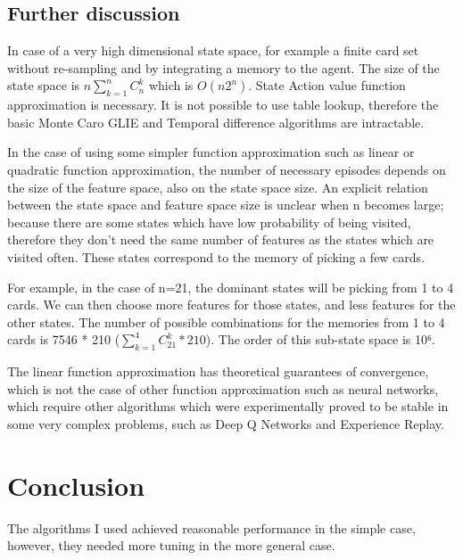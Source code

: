 \documentclass[12pt,a4paper]{article}
\begin{document}
\newpage
\subsection{Further discussion}

In case of a very high dimensional state space, for example a finite card set without re-sampling and by integrating a memory to the agent. The size of the state space is $n \sum_{k=1}^{n}{C_n^k}$ which is $O(n2^n)$. State Action value function approximation is necessary.
It is not possible to use table lookup, therefore the basic Monte Caro GLIE and Temporal difference algorithms are intractable.

In the case of using some simpler function approximation such as linear or quadratic function approximation, the number of necessary episodes depends on the size of the feature space, also on the state space size. An explicit relation between the state space and feature space size is unclear when n becomes large; because there are some states which have low probability of being visited, therefore they don't need the same number of features as the states which are visited often. These states correspond to the memory of picking a few cards.

For example, in the case of n=21, the dominant states will be picking from 1 to 4 cards. We can then choose more features for those states, and less features for the other states. The number of possible combinations for the memories from 1 to 4 cards is 7546 * 210 ($\sum_{k=1}^{4}{C_21^k} * 210$). The order of this sub-state space is 10⁶. 

The linear function approximation has theoretical guarantees of convergence, which is not the case of other function approximation such as neural networks, which require other algorithms which were experimentally proved to be stable in some very complex problems, such as Deep Q Networks and Experience Replay\cite{mnih-dqn-2015}.




\newpage
\section{Conclusion}
The algorithms I used achieved reasonable performance in the simple case, however, they needed more tuning in the more general case.
\end{document}
